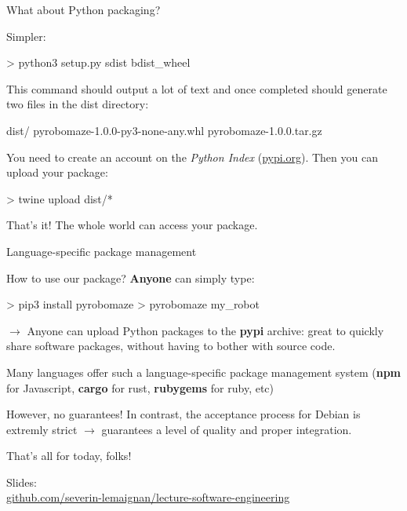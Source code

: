\documentclass[compress]{beamer}
\begin{document}
\begin{frame}[fragile]{What about Python packaging?}

    Simpler:

\begin{shcode}
> python3 setup.py sdist bdist_wheel
\end{shcode}

This command should output a lot of text and once completed should generate two files in the dist directory:

\begin{shcode}
dist/
  pyrobomaze-1.0.0-py3-none-any.whl
  pyrobomaze-1.0.0.tar.gz
\end{shcode}

    You need to create an account on the \emph{Python Index} (\url{pypi.org}).
    Then you can upload your package:

\begin{shcode}
> twine upload dist/*
\end{shcode}

That's it! The whole world can access your package.


\end{frame}


\begin{frame}[fragile]{Language-specific package management}

    How to use our package? {\bf Anyone} can simply type:

\begin{shcode}
> pip3 install pyrobomaze
> pyrobomaze my_robot
\end{shcode}

    $\rightarrow$ Anyone can upload Python packages to the {\bf pypi} archive: great to
    quickly share software packages, without having to bother with source code.

\pause

    Many languages offer such a language-specific package management system
    ({\bf npm} for Javascript, {\bf cargo} for rust, {\bf rubygems} for ruby,
    etc)

\pause

    However, no guarantees! In contrast, the acceptance process for Debian is
    extremly strict $\rightarrow$ guarantees a level of quality and proper
    integration.

\end{frame}

\begin{frame}{}
    \begin{center}
        \Large
        That's all for today, folks!\\[2em]
    \end{center}

        \vspace{10em}

        Slides:\\
        \href{https://github.com/severin-lemaignan/lecture-software-engineering}{\small
        github.com/severin-lemaignan/lecture-software-engineering}


\end{frame}
\end{document}
